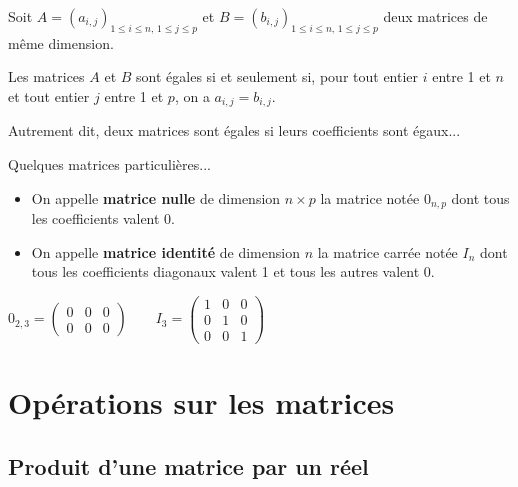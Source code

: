 \documentclass[11pt,fleqn]{book} %
\begin{document}
\begin{definition}Soit $A =  (a_{i,j})_{ 1 \leqslant i \leqslant n ,\, 1 \leqslant j \leqslant p}$ et $B= (b_{i,j})_{ 1 \leqslant i \leqslant n ,\, 1 \leqslant j \leqslant p}$ deux matrices de même dimension.

Les matrices $A$ et $B$ sont égales si et seulement si, pour tout entier $i$ entre 1 et $n$ et tout entier $j$ entre 1 et $p$, on a $a_{i,j}=b_{i,j}$.\end{definition}

Autrement dit, deux matrices sont égales si leurs coefficients sont égaux...

\begin{definition}Quelques matrices particulières...

\begin{itemize}
\item On appelle \textbf{matrice nulle} de dimension $n \times p$ la matrice notée $0_{n,p}$ dont tous les coefficients valent 0.
\item On appelle \textbf{matrice identité} de dimension $n$ la matrice carrée notée $I_n$ dont tous les coefficients diagonaux valent 1 et tous les autres valent 0.
\end{itemize}\end{definition}

\begin{example} $0_{2,3} = \begin{pmatrix}
0 & 0 & 0 \\ 0& 0&0
\end{pmatrix} \qquad I_3 = \begin{pmatrix}
1 & 0 & 0 \\ 0 & 1 & 0 \\ 0 & 0 &1
\end{pmatrix}$\end{example}

\section{Opérations sur les matrices}

\subsection{Produit d'une matrice par un réel}
\end{document}
